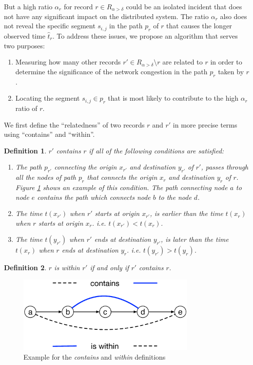 \documentclass[conference]{IEEEtran.1.8}
\newtheorem{definition}{Definition}
\begin{document}
But a high ratio $\alpha_r$ for record $r \in R_{\alpha > \delta}$ could be an isolated incident that does not have any significant impact on the distributed system. The ratio $\alpha_r$ also does not reveal the specific segment $s_{i,j}$ in the path $p_r$ of $r$ that causes the longer observed time $\hat{t}_r$. To address these issues, we propose an algorithm that serves two purposes:
\begin{enumerate}
	\item Measuring how many other records $r' \in R_{\alpha > \delta}\setminus{r}$ are related to $r$ in order to determine the significance of the network congestion in the path $p_r$ taken by $r$.
	\item Locating the segment $s_{i,j} \in p_r$ that is most likely to contribute to the high $\alpha_r$ ratio of $r$.
\end{enumerate}
We first define the ``relatedness'' of two records $r$ and $r'$ in more precise terms using ``contains'' and ``within''.
\begin{definition}
	$r'$ \emph{contains} $r$ if all of the following conditions are satisfied: 
	\begin{enumerate}
		\item The path $p_{r'}$ connecting the origin $x_{r'}$ and destination $y_{r'}$ of $r'$, passes through all the nodes of path $p_{r}$ that connects the origin $x_{r}$ and destination $y_{r}$ of $r$. Figure \ref{fig:contain_within_example} shows an example of this condition. The path connecting node $a$ to node $e$ contains the path which connects node $b$ to the node $d$.
		\item The time $t(x_{r'})$ when $r'$ starts at origin $x_{r'}$, is earlier than the time $t(x_{r})$ when $r$ starts at origin $x_{r}$. i.e. $t(x_{r'}) < t(x_{r})$.
		\item The time $t(y_{r'})$ when $r'$ ends at destination $y_{r'}$, is later than the time $t(x_{r})$ when $r$ ends at destination $y_{r}$. i.e. $t(y_{r'}) > t(y_{r})$.
	\end{enumerate}
\end{definition}
\begin{definition}
	$r$ is \emph{within} $r'$ if and only if $r'$ contains $r$.
\end{definition}

\begin{figure}
	\centering
	\includegraphics[width=3.5in]{contain_within_example}
	\caption{Example for the \emph{contains} and \emph{within} definitions}
	\label{fig:contain_within_example}
\end{figure}
\end{document}
